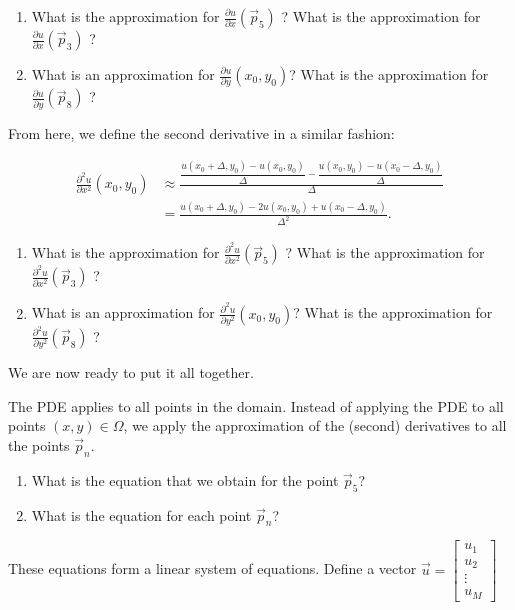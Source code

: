 \begin{enumerate}[resume, label=\emph{\arabic*.}] 
\item What is the approximation for $\frac{\partial u}{\partial x} (\vec{p}_5)$ ?
What is the approximation for $\frac{\partial u}{\partial x} (\vec{p}_3)$ ?

\item What is an approximation for $\frac{\partial u}{\partial y}(x_0,y_0)$?
What is the approximation for $\frac{\partial u}{\partial y} (\vec{p}_8)$ ?
\end{enumerate}


From here, we define the second derivative in a similar fashion:

\begin{align*}
\frac{\partial^2u}{\partial x^2}(x_0,y_0) 
	& \approx \frac{\dfrac{u(x_0+\Delta,y_0)-u(x_0,y_0)}{\Delta} - \dfrac{u(x_0,y_0)-u(x_0-\Delta,y_0)}{\Delta}}{\Delta}  \\
	& = \frac{u(x_0+\Delta,y_0) - 2 u(x_0,y_0) + u(x_0-\Delta,y_0)}{\Delta^2}.
\end{align*}

\begin{enumerate}[resume, label=\emph{\arabic*.}] 
\item What is the approximation for $\frac{\partial^2 u}{\partial x^2} (\vec{p}_5)$ ?
What is the approximation for $\frac{\partial^2 u}{\partial x^2} (\vec{p}_3)$ ?

\item What is an approximation for $\frac{\partial^2 u}{\partial y^2}(x_0,y_0)$?
What is the approximation for $\frac{\partial^2 u}{\partial y^2} (\vec{p}_8)$ ?
\end{enumerate}

We are now ready to put it all together. 

The PDE applies to all points in the domain. Instead of applying the PDE to all points $(x,y) \in \Omega$, we apply the approximation of the (second) derivatives to all the points $\vec{p}_n$.


\begin{enumerate}[resume, label=\emph{\arabic*.}] 
\item What is the equation that we obtain for the point $\vec{p}_5$?

\item What is the equation for each point $\vec{p}_n$?
\end{enumerate}


These equations form a linear system of equations.
Define a vector $\vec{u}  = \begin{bmatrix}
u_1 \\
u_2 \\
\vdots \\
u_M
\end{bmatrix}
$

